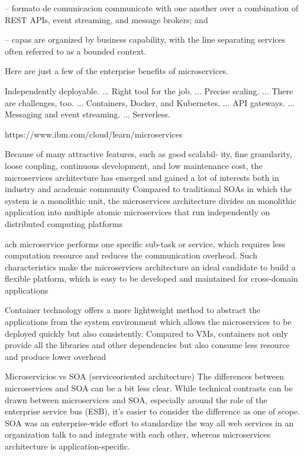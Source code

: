 -- formato de comunicacion communicate with one another over a combination of REST APIs, event streaming, and message brokers; and

-- capas are organized by business capability, with the line separating services often referred to as a bounded context.

Here are just a few of the enterprise benefits of microservices.

Independently deployable. ...
Right tool for the job. ...
Precise scaling. ...
There are challenges, too. ...
Containers, Docker, and Kubernetes. ...
API gateways. ...
Messaging and event streaming. ...
Serverless.

https://www.ibm.com/cloud/learn/microservices



Because of many attractive features, such as good scalabil-
ity, fine granularity, loose coupling, continuous development,
and low maintenance cost, the microservices architecture has
emerged and gained a lot of interests both in industry and
academic community
Compared to traditional SOAs
in which the system is a monolithic unit, the microservices
architecture divides an monolithic application into multiple
atomic microservices that run independently on distributed
computing platforms

ach microservice performs one specific
sub-task or service, which requires less computation resource
and reduces the communication overhead. Such characteristics
make the microservices architecture an ideal candidate to
build a flexible platform, which is easy to be developed and
maintained for cross-domain applications


Container technology offers a more lightweight method to
abstract the applications from the system environment which
allows the microservices to be deployed quickly but also
consistently. Compared to VMs, containers not only provide
all the libraries and other dependencies but also consume less
resource and produce lower overhead







Microservicios vs SOA (serviceoriented architecture)
The differences between microservices and SOA can be a bit less clear. While technical contrasts can be drawn between microservices and SOA, especially around the role of the enterprise service bus (ESB), it’s easier to consider the difference as one of scope. SOA was an enterprise-wide effort to standardize the way all web services in an organization talk to and integrate with each other, whereas microservices architecture is application-specific.

